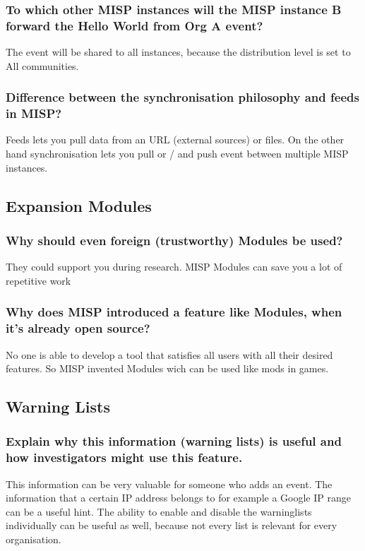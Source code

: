 \subsubsection{To which other MISP instances will the MISP instance B forward the Hello World from Org A event?}
The event will be shared to all instances, because the distribution level is set to All communities.

\subsubsection{Difference between the synchronisation philosophy and feeds in MISP?}
Feeds lets you pull data from an URL (external sources) or files. On the other hand synchronisation lets you pull or / and push event between multiple MISP instances.

\subsection{Expansion Modules}

\subsubsection{Why should even foreign (trustworthy) Modules be used?}
They could support you during research. MISP Modules can save you a lot of repetitive work

\subsubsection{Why does MISP introduced a feature like Modules, when it's already open source?}
No one is able to develop a tool that satisfies all users with all their desired features. So MISP invented Modules wich can be used like mods in games.



\subsection{Warning Lists}

\subsubsection{Explain why this information (warning lists) is useful and how investigators might use this feature.}
This information can be very valuable for someone who adds an event. The information that a certain IP address belongs to for example a Google IP range can be a useful hint. The ability to enable and disable the warninglists individually can be useful as well, because not every list is relevant for every organisation.

